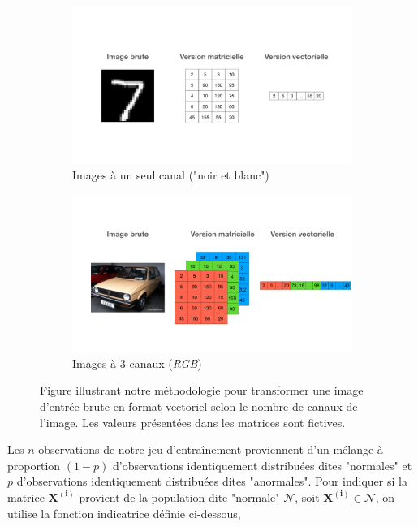 \begin{figure}[h]
	\centering
	\begin{subfigure}{12cm}
		\centering
		\includegraphics[width=1\linewidth]{images/keynote/one-hot-transfo}
		\caption{Images à un seul canal ("noir et blanc")}
	\end{subfigure}
	\begin{subfigure}{12cm}
		\centering
		\includegraphics[width=1\linewidth]{images/keynote/one-hot-transfo-rgb}
		\caption{Images à 3 canaux (\textit{RGB})}
	\end{subfigure}
	\caption{Figure illustrant notre méthodologie pour transformer une image d'entrée brute en format vectoriel selon le nombre de canaux de l'image. Les valeurs présentées dans les matrices sont fictives.}
		\label{fig:one_hot}
\end{figure}


Les $n$ observations de notre jeu d'entraînement proviennent d'un mélange à proportion $(1-p)$ d'observations identiquement distribuées dites "normales" et $p$ d'observations identiquement distribuées dites "anormales". Pour indiquer si la matrice $\boldsymbol{X^{(i)}}$ provient de la population dite "normale" $\mathcal{N}$, soit $ \boldsymbol{X^{(i)}}\in\mathcal{N}$, on utilise la fonction indicatrice définie ci-dessous,

